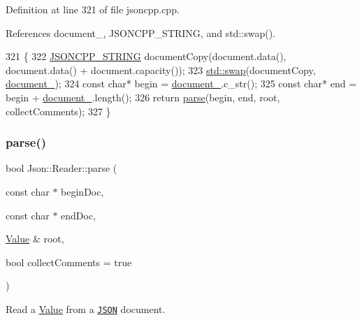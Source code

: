 Definition at line 321 of file jsoncpp.\+cpp.



References document\+\_\+, J\+S\+O\+N\+C\+P\+P\+\_\+\+S\+T\+R\+I\+NG, and std\+::swap().


\begin{DoxyCode}
321                                                                           \{
322   \hyperlink{json_8h_a1e723f95759de062585bc4a8fd3fa4be}{JSONCPP\_STRING} documentCopy(document.data(), document.data() + document.capacity());
323   \hyperlink{namespacestd_a22cc6fcbbb1f2f705c7888b615e43582}{std::swap}(documentCopy, \hyperlink{class_json_1_1_reader_abf99e137bc92a93623dc97598702261a}{document\_});
324   \textcolor{keyword}{const} \textcolor{keywordtype}{char}* begin = \hyperlink{class_json_1_1_reader_abf99e137bc92a93623dc97598702261a}{document\_}.c\_str();
325   \textcolor{keyword}{const} \textcolor{keywordtype}{char}* end = begin + \hyperlink{class_json_1_1_reader_abf99e137bc92a93623dc97598702261a}{document\_}.length();
326   \textcolor{keywordflow}{return} \hyperlink{class_json_1_1_reader_af1da6c976ad1e96c742804c3853eef94}{parse}(begin, end, root, collectComments);
327 \}
\end{DoxyCode}
\mbox{\label{class_json_1_1_reader_ac71ef2b64c7c27b062052e692af3fb32}} 
\subsubsection{\texorpdfstring{parse()}{parse()}\hspace{0.1cm}{\footnotesize\ttfamily [2/3]}}
{\footnotesize\ttfamily bool Json\+::\+Reader\+::parse (\begin{DoxyParamCaption}\item[{const char $\ast$}]{begin\+Doc,  }\item[{const char $\ast$}]{end\+Doc,  }\item[{\hyperlink{class_json_1_1_value}{Value} \&}]{root,  }\item[{bool}]{collect\+Comments = {\ttfamily true} }\end{DoxyParamCaption})}



Read a \hyperlink{class_json_1_1_value}{Value} from a \href{http://www.json.org}{\tt J\+S\+ON} document. 


